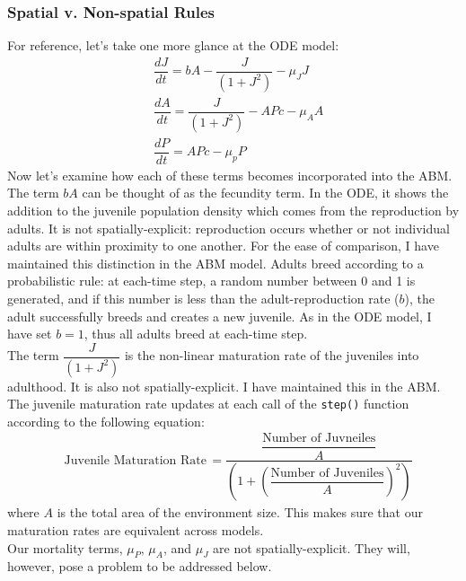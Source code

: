 \documentclass[12pt]{article}
\begin{document}
\subsubsection{Spatial v. Non-spatial Rules}

For reference, let's take one more glance at the ODE model: 
\begin{align}
	& \dfrac{dJ}{dt} = bA - \dfrac{J}{(1+J^2)} - \mu_JJ\\
	& \dfrac{dA}{dt} = \dfrac{J}{(1+J^2)} - APc - \mu_AA\\
	& \dfrac{dP}{dt} = APc - \mu_pP
\end{align}
Now let's examine how each of these terms becomes incorporated into the ABM. \\

The term $bA$ can be thought of as the fecundity term. In the ODE, it shows the addition to the juvenile population density which comes from the reproduction by adults. It is not spatially-explicit: reproduction occurs whether or not individual adults are within proximity to one another. For the ease of comparison, I have maintained this distinction in the ABM model. Adults breed according to a probabilistic rule: at each-time step, a random number between 0 and 1 is generated, and if this number is less than the adult-reproduction rate ($b$), the adult successfully breeds and creates a new juvenile. As in the ODE model, I have set $b=1$, thus all adults breed at each-time step. \\

The term $ \dfrac{J}{(1+J^2)}$ is the non-linear maturation rate of the juveniles into adulthood. It is also not spatially-explicit. I have maintained this in the ABM. The juvenile maturation rate updates at each call of the \texttt{step()} function according to the following equation:
\begin{align*}
	& \text{Juvenile Maturation Rate}\,=\dfrac{\dfrac{\text{Number of Juvneiles}}{A}}{\left(1+\left(\dfrac{\text{Number of Juveniles}}{A}\right)^2\right)}
\end{align*}
where $A$ is the total area of the environment size. This makes sure that our maturation rates are equivalent across models.\\

Our mortality terms, $\mu_P$, $\mu_A$, and $\mu_J$ are not spatially-explicit. They will, however, pose a problem to be addressed below.\\
\end{document}

